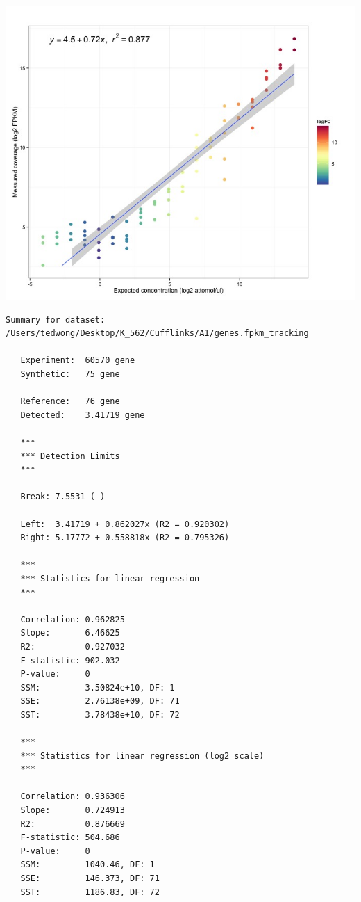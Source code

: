 \documentclass[]{article}
\begin{document}
\includegraphics{samples/TransExpress_Sample.jpeg}

\pagebreak

\begin{verbatim}
Summary for dataset: /Users/tedwong/Desktop/K_562/Cufflinks/A1/genes.fpkm_tracking

   Experiment:  60570 gene
   Synthetic:   75 gene

   Reference:   76 gene
   Detected:    3.41719 gene

   ***
   *** Detection Limits
   ***

   Break: 7.5531 (-)

   Left:  3.41719 + 0.862027x (R2 = 0.920302)
   Right: 5.17772 + 0.558818x (R2 = 0.795326)

   ***
   *** Statistics for linear regression
   ***

   Correlation: 0.962825
   Slope:       6.46625
   R2:          0.927032
   F-statistic: 902.032
   P-value:     0
   SSM:         3.50824e+10, DF: 1
   SSE:         2.76138e+09, DF: 71
   SST:         3.78438e+10, DF: 72

   ***
   *** Statistics for linear regression (log2 scale)
   ***

   Correlation: 0.936306
   Slope:       0.724913
   R2:          0.876669
   F-statistic: 504.686
   P-value:     0
   SSM:         1040.46, DF: 1
   SSE:         146.373, DF: 71
   SST:         1186.83, DF: 72
\end{verbatim}
\end{document}
